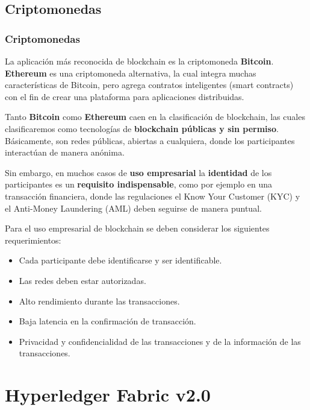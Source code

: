 \documentclass{beamer}
\begin{document}
	\subsection{Criptomonedas}
	\begin{frame}
		\frametitle{Criptomonedas}
		La aplicación más reconocida de blockchain es la criptomoneda \textbf{Bitcoin}.\\
		\vspace{4mm}
		\textbf{Ethereum} es una criptomoneda alternativa, la cual integra muchas características de Bitcoin, pero agrega contratos inteligentes (smart contracts) con el fin de crear una plataforma para aplicaciones distribuidas.
	\end{frame}
	
	\begin{frame}
		Tanto \textbf{Bitcoin} como \textbf{Ethereum} caen en la clasificación de blockchain, las cuales clasificaremos como tecnologías de \textbf{blockchain públicas y sin permiso}. Básicamente, son redes públicas, abiertas a cualquiera, donde los participantes interactúan de manera anónima.
	\end{frame}

	\begin{frame}
		Sin embargo, en muchos casos de \textbf{uso empresarial} la \textbf{identidad} de los participantes es un \textbf{requisito indispensable}, como por ejemplo en una transacción financiera, donde las regulaciones el Know Your Customer (KYC) y el Anti-Money Laundering (AML) deben seguirse de manera puntual.
	\end{frame}
	
	\begin{frame}
		Para el uso empresarial de blockchain se deben considerar los siguientes requerimientos:
		
		\begin{itemize}
			\item Cada participante debe identificarse y ser identificable.
			\item Las redes deben estar autorizadas.
			\item Alto rendimiento durante las transacciones.
			\item Baja latencia en la confirmación de transacción.
			\item Privacidad y confidencialidad de las transacciones y de la información de las transacciones.
		\end{itemize}
	\end{frame}
	
	\section{Hyperledger Fabric v2.0}
	
\end{document}
